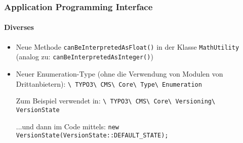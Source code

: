 \begin{frame}[fragile]
	\frametitle{Application Programming Interface}
	\framesubtitle{Diverses}

	\begin{itemize}
		\item Neue Methode \texttt{canBeInterpretedAsFloat()}\newline
			in der Klasse \texttt{MathUtility}\newline
			\small(analog zu: \texttt{canBeInterpretedAsInteger()})\normalsize
		\item Neuer Enumeration-Type (ohne die Verwendung von Modulen von Drittanbietern):
			\texttt{\textbackslash
				TYPO3\textbackslash
				CMS\textbackslash
				Core\textbackslash
				Type\textbackslash
				Enumeration}\newline

			Zum Beispiel verwendet in:\newline
			\small
				\texttt{\textbackslash
					TYPO3\textbackslash
					CMS\textbackslash
					Core\textbackslash
					Versioning\textbackslash
					VersionState}
			\normalsize\newline

			...und dann im Code mittels:\newline
			\small
				\texttt{new VersionState(VersionState::DEFAULT\_STATE);}
			
			\normalsize

	\end{itemize}

\end{frame}


